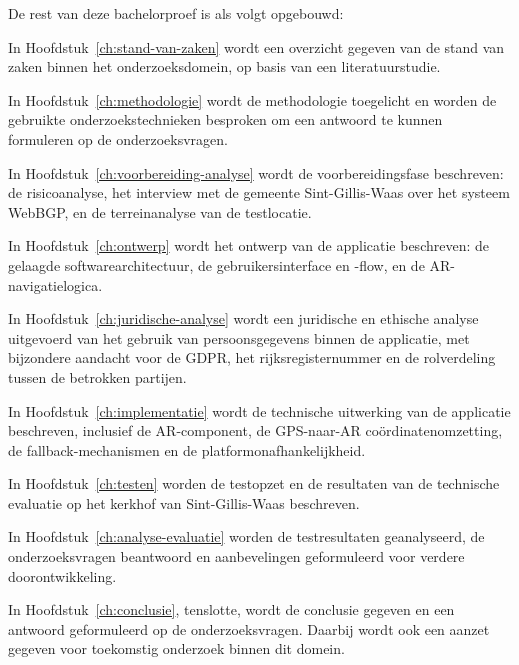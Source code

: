 De rest van deze bachelorproef is als volgt opgebouwd:

In Hoofdstuk~\ref{ch:stand-van-zaken} wordt een overzicht gegeven van de stand van zaken binnen het onderzoeksdomein, op basis van een literatuurstudie.

In Hoofdstuk~\ref{ch:methodologie} wordt de methodologie toegelicht en worden de gebruikte onderzoekstechnieken besproken om een antwoord te kunnen formuleren op de onderzoeksvragen.

In Hoofdstuk~\ref{ch:voorbereiding-analyse} wordt de voorbereidingsfase
beschreven: de risicoanalyse, het interview met de gemeente Sint-Gillis-Waas
over het systeem WebBGP, en de terreinanalyse van de testlocatie.

In Hoofdstuk~\ref{ch:ontwerp} wordt het ontwerp van de applicatie beschreven:
de gelaagde softwarearchitectuur, de gebruikersinterface en -flow, en de
AR-navigatielogica.

In Hoofdstuk~\ref{ch:juridische-analyse} wordt een juridische en ethische
analyse uitgevoerd van het gebruik van persoonsgegevens binnen de applicatie,
met bijzondere aandacht voor de GDPR, het rijksregisternummer en de rolverdeling
tussen de betrokken partijen.

In Hoofdstuk~\ref{ch:implementatie} wordt de technische uitwerking van de
applicatie beschreven, inclusief de AR-component, de GPS-naar-AR coördinatenomzetting,
de fallback-mechanismen en de platformonafhankelijkheid.

In Hoofdstuk~\ref{ch:testen} worden de testopzet en de resultaten van de
technische evaluatie op het kerkhof van Sint-Gillis-Waas beschreven.

In Hoofdstuk~\ref{ch:analyse-evaluatie} worden de testresultaten geanalyseerd,
de onderzoeksvragen beantwoord en aanbevelingen geformuleerd voor verdere
doorontwikkeling.

In Hoofdstuk~\ref{ch:conclusie}, tenslotte, wordt de conclusie gegeven en een antwoord geformuleerd op de onderzoeksvragen. Daarbij wordt ook een aanzet gegeven voor toekomstig onderzoek binnen dit domein.